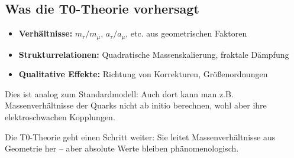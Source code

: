 \subsection{Was die T0-Theorie vorhersagt}

\begin{itemize}
	\item \textbf{Verhältnisse:} $m_\tau/m_\mu$, $a_\tau/a_\mu$, etc. aus geometrischen 
	Faktoren
	
	\item \textbf{Strukturrelationen:} Quadratische Massenskalierung, fraktale Dämpfung
	
	\item \textbf{Qualitative Effekte:} Richtung von Korrekturen, Größenordnungen
\end{itemize}

Dies ist analog zum Standardmodell: Auch dort kann man z.B. Massenverhältnisse der 
Quarks nicht ab initio berechnen, wohl aber ihre elektroschwachen Kopplungen.

Die T0-Theorie geht einen Schritt weiter: Sie leitet Massenverhältnisse aus 
Geometrie her -- aber absolute Werte bleiben phänomenologisch.


